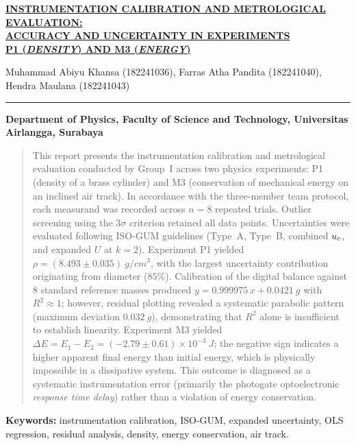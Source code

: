 \begin{center}
    \underline{\textbf{INSTRUMENTATION CALIBRATION AND METROLOGICAL EVALUATION:}} \\
    \underline{\textbf{ACCURACY AND UNCERTAINTY IN EXPERIMENTS}} \\
    \underline{\textbf{P1 (\textit{DENSITY}) AND M3 (\textit{ENERGY})}}
\end{center}

\begin{center}
    Muhammad Abiyu Khansa (182241036), Farras Atha Pandita (182241040), Hendra Maulana (182241043)
\end{center}

\hrule height 2pt

\begin{center}
    \textbf{Department of Physics, Faculty of Science and Technology, Universitas Airlangga, Surabaya}
\end{center}

\vspace{10pt}
\renewcommand{\abstractname}{\normalsize{ABSTRACT}}
\begin{abstract}
\noindent
This report presents the instrumentation calibration and metrological evaluation conducted by Group~I across two physics experiments: P1 (density of a brass cylinder) and M3 (conservation of mechanical energy on an inclined air track). In accordance with the three-member team protocol, each measurand was recorded across $n=8$ repeated trials. Outlier screening using the $3\sigma$ criterion retained all data points. Uncertainties were evaluated following ISO-GUM guidelines (Type~A, Type~B, combined $\uc$, and expanded $U$ at $k=2$). Experiment P1 yielded $\rho=(8.493\pm0.035)\ \si{g/cm^3}$, with the largest uncertainty contribution originating from diameter ($85\%$). Calibration of the digital balance against $8$ standard reference masses produced $y=0.999975\,x+0.0421\ \si{g}$ with $R^2\approx 1$; however, residual plotting revealed a systematic parabolic pattern (maximum deviation $0.032\ \si{g}$), demonstrating that $R^2$ alone is insufficient to establish linearity. Experiment M3 yielded $\Delta E=E_1-E_2=(-2.79\pm0.61)\times10^{-3}\ \si{J}$; the negative sign indicates a higher apparent final energy than initial energy, which is physically impossible in a dissipative system. This outcome is diagnosed as a systematic instrumentation error (primarily the photogate optoelectronic \textit{response time delay}) rather than a violation of energy conservation.
\end{abstract}

\vspace{5pt}
\noindent\textbf{Keywords:} instrumentation calibration, ISO-GUM, expanded uncertainty, OLS regression, residual analysis, density, energy conservation, air track.
